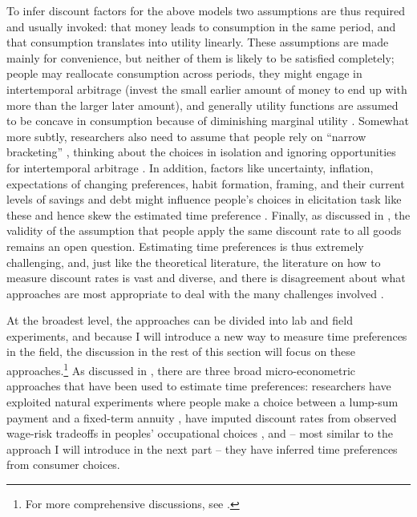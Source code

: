 \documentclass[a4paper, 11pt]{report}
\begin{document}
To infer discount factors for the above models two assumptions are thus required and usually invoked: that money leads to consumption in the same period, and that consumption translates into utility linearly. These assumptions are made mainly for convenience, but neither of them is likely to be satisfied completely; people may reallocate consumption across periods, they might engage in intertemporal arbitrage (invest the small earlier amount of money to end up with more than the larger later amount), and generally utility functions are assumed to be concave in consumption because of diminishing marginal utility \citep{frederick2002time,cohen2020measuring}. Somewhat more subtly, researchers also need to assume that people rely on ``narrow bracketing'' \citep{read1999choice}, thinking about the choices in isolation and ignoring opportunities for intertemporal arbitrage \citep{frederick2002time,read2018intertemporal}. In addition, factors like uncertainty, inflation, expectations of changing preferences, habit formation, framing, and their current levels of savings and debt might influence people's choices in elicitation task like these and hence skew the estimated time preference \citep{frederick2002time}. Finally, as discussed in \citet{read2018intertemporal}, the validity of the assumption that people apply the same discount rate to all goods remains an open question. Estimating time preferences is thus extremely challenging, and, just like the theoretical literature, the literature on how to measure discount rates is vast and diverse, and there is disagreement about what approaches are most appropriate to deal with the many challenges involved \citep{cohen2020measuring}.

At the broadest level, the approaches can be divided into lab and field experiments, and because I will introduce a new way to measure time preferences in the field, the discussion in the rest of this section will focus on these approaches.\footnote{For more comprehensive discussions, see \citet{frederick2002time,cohen2020measuring}.} As discussed in \citet{frederick2002time,cohen2020measuring}, there are three broad micro-econometric approaches that have been used to estimate time preferences: researchers have exploited natural experiments where people make a choice between a lump-sum payment and a fixed-term annuity \citep{warner2001personal}, have imputed discount rates from observed wage-risk tradeoffs in peoples' occupational choices \citet{moore1990models}, and -- most similar to the approach I will introduce in the next part -- they have inferred time preferences from consumer choices.
\end{document}
